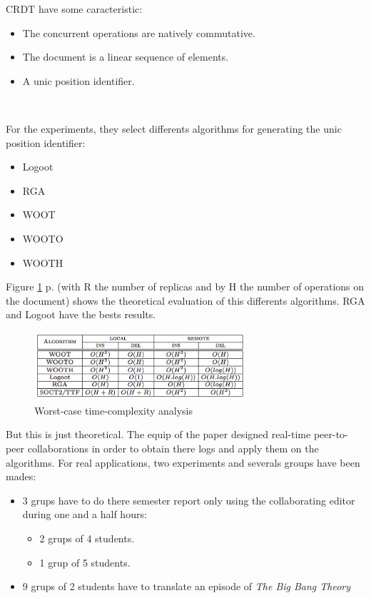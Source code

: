 CRDT have some caracteristic:
\begin{itemize}
	\item The concurrent operations are natively commutative.
	\item The document is a linear sequence of elements.
	\item A unic position identifier.
\end{itemize}~

For the experiments, they select differents algorithms for generating the unic position identifier:
\begin{itemize}
	\item Logoot
	\item RGA
	\item WOOT
	\item WOOTO
	\item WOOTH
\end{itemize}

Figure \ref{fig:worst} p.\pageref{fig:worst} (with R the number of replicas and by H the number of operations on the document) shows the theoretical evaluation of this differents algorithms. RGA and Logoot have the bests results.

\begin{figure}[h]
  \center
  \includegraphics[width=0.7\textwidth]{includes/worst.png}
  \caption{Worst-case time-complexity analysis}
  \label{fig:worst}
\end{figure}


But this is just theoretical. The equip of the paper designed real-time peer-to-peer collaborations in order to obtain there logs and apply them on the algorithms. For real applications, two experiments and severals groups have been mades:
\begin{itemize}
	\item 3 grups have to do there semester report only using the collaborating editor during one and a half hours:
		\begin{itemize}
			\item 2 grups of 4 students.
			\item 1 grup of 5 students.
		\end{itemize}
	\item 9 grups of 2 students have to translate an episode of \emph{The Big Bang Theory}
\end{itemize}~

